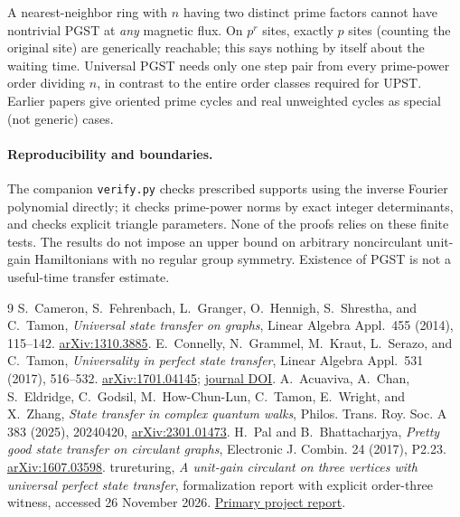 \documentclass[10pt]{article}
\begin{document}
A nearest-neighbor ring with $n$ having two distinct prime factors
cannot have nontrivial PGST at \emph{any} magnetic flux. On $p^r$ sites,
exactly $p$ sites (counting the original site) are generically reachable;
this says nothing by itself about the waiting time. Universal PGST
needs only one step pair from every prime-power order dividing $n$,
in contrast to the entire order classes required for UPST. Earlier
papers give oriented prime cycles \cite{cameron} and real unweighted
cycles \cite{pal} as special (not generic) cases.

\paragraph{Reproducibility and boundaries.}
The companion \texttt{verify.py} checks prescribed supports using the
inverse Fourier polynomial directly; it checks prime-power norms by exact
integer determinants, and checks explicit triangle parameters. None of
the proofs relies on these finite tests. The results do not impose an upper
bound on arbitrary noncirculant unit-gain Hamiltonians with no regular
group symmetry. Existence of PGST is not a useful-time transfer estimate.

\begin{thebibliography}{9}
 S.~Cameron, S.~Fehrenbach, L.~Granger, O.~Hennigh, S.~Shrestha, and C.~Tamon,
\emph{Universal state transfer on graphs}, Linear Algebra Appl.~455 (2014), 115--142.
\href{https://arxiv.org/abs/1310.3885}{arXiv:1310.3885}.
 E.~Connelly, N.~Grammel, M.~Kraut, L.~Serazo, and C.~Tamon,
\emph{Universality in perfect state transfer}, Linear Algebra Appl.~531 (2017), 516--532.
\href{https://arxiv.org/abs/1701.04145}{arXiv:1701.04145};
\href{https://doi.org/10.1016/j.laa.2017.06.015}{journal DOI}.
 A.~Acuaviva, A.~Chan, S.~Eldridge, C.~Godsil, M.~How-Chun-Lun, C.~Tamon, E.~Wright, and X.~Zhang, \emph{State transfer in complex quantum walks}, Philos. Trans. Roy. Soc. A 383 (2025), 20240420,
\href{https://arxiv.org/abs/2301.01473}{arXiv:2301.01473}.
 H.~Pal and B.~Bhattacharjya, \emph{Pretty good state transfer on circulant graphs},
Electronic J. Combin. 24 (2017), P2.23.
\href{https://arxiv.org/abs/1607.03598}{arXiv:1607.03598}.
 trureturing, \emph{A unit-gain circulant on three vertices with universal perfect state transfer}, formalization report with explicit order-three witness, accessed 26 November 2026.
\href{https://www.trureturing.org/research/connelly-2017-property-t-universal-state-transfer/}{Primary project report}.
\end{thebibliography}
\end{document}

